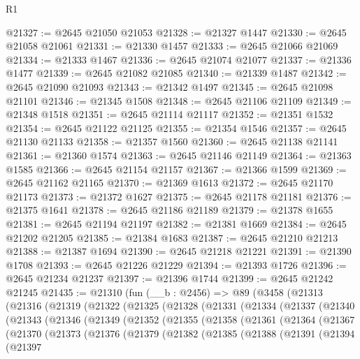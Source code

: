 \begin{lexlean}{R1}
\begin{coremodule}
@21327 := @2645 @21050 @21053
@21328 := @21327 @1447
@21330 := @2645 @21058 @21061
@21331 := @21330 @1457
@21333 := @2645 @21066 @21069
@21334 := @21333 @1467
@21336 := @2645 @21074 @21077
@21337 := @21336 @1477
@21339 := @2645 @21082 @21085
@21340 := @21339 @1487
@21342 := @2645 @21090 @21093
@21343 := @21342 @1497
@21345 := @2645 @21098 @21101
@21346 := @21345 @1508
@21348 := @2645 @21106 @21109
@21349 := @21348 @1518
@21351 := @2645 @21114 @21117
@21352 := @21351 @1532
@21354 := @2645 @21122 @21125
@21355 := @21354 @1546
@21357 := @2645 @21130 @21133
@21358 := @21357 @1560
@21360 := @2645 @21138 @21141
@21361 := @21360 @1574
@21363 := @2645 @21146 @21149
@21364 := @21363 @1585
@21366 := @2645 @21154 @21157
@21367 := @21366 @1599
@21369 := @2645 @21162 @21165
@21370 := @21369 @1613
@21372 := @2645 @21170 @21173
@21373 := @21372 @1627
@21375 := @2645 @21178 @21181
@21376 := @21375 @1641
@21378 := @2645 @21186 @21189
@21379 := @21378 @1655
@21381 := @2645 @21194 @21197
@21382 := @21381 @1669
@21384 := @2645 @21202 @21205
@21385 := @21384 @1683
@21387 := @2645 @21210 @21213
@21388 := @21387 @1694
@21390 := @2645 @21218 @21221
@21391 := @21390 @1708
@21393 := @2645 @21226 @21229
@21394 := @21393 @1726
@21396 := @2645 @21234 @21237
@21397 := @21396 @1744
@21399 := @2645 @21242 @21245
@21435 := @21310
    (fun (__b : @2456) =>
    @89
      (@3458
        (@21313
          (@21316
            (@21319
              (@21322
                (@21325
                  (@21328
                    (@21331
                      (@21334
                        (@21337
                          (@21340
                            (@21343
                              (@21346
                                (@21349
                                  (@21352
                                    (@21355
                                      (@21358
                                        (@21361
                                          (@21364
                                            (@21367
                                              (@21370
                                                (@21373
                                                  (@21376
                                                    (@21379
                                                      (@21382
                                                        (@21385
                                                          (@21388
                                                            (@21391
                                                              (@21394
                                                                (@21397

\end{coremodule}
\end{lexlean}
